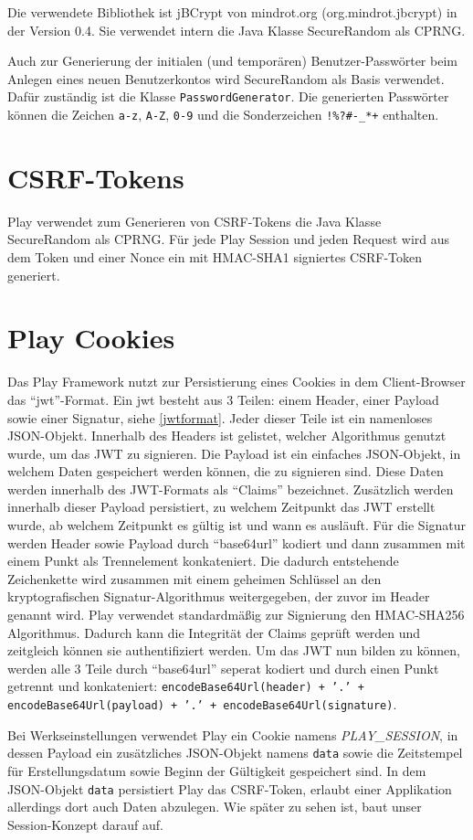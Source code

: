 \documentclass[12pt,DIV14,BCOR10mm,a4paper,parskip=half-,headsepline,headinclude,english,ngerman,bibliography=totocnumbered]{scrreprt}
\begin{document}
Die verwendete Bibliothek ist jBCrypt von mindrot.org (org.mindrot.jbcrypt) in der Version 0.4. Sie verwendet intern die Java Klasse SecureRandom als CPRNG.

Auch zur Generierung der initialen (und temporären) Benutzer-Passwörter beim Anlegen eines neuen Benutzerkontos wird SecureRandom als Basis verwendet. Dafür zuständig ist die Klasse \texttt{PasswordGenerator}. Die generierten Passwörter können die Zeichen \texttt{a-z}, \texttt{A-Z}, \texttt{0-9} und die Sonderzeichen \texttt{!\%?\#-\_*+} enthalten.

\section{CSRF-Tokens}
Play verwendet zum Generieren von CSRF-Tokens die Java Klasse SecureRandom als CPRNG. Für jede Play Session und jeden Request wird aus dem Token und einer Nonce ein mit HMAC-SHA1 signiertes CSRF-Token generiert.

\section{Play Cookies}
\label{play:cookies}
Das Play Framework nutzt zur Persistierung eines Cookies in dem Client-Browser das \enquote{\gls{jwt}}-Format.
Ein \gls{jwt} besteht aus 3 Teilen: einem Header, einer Payload sowie einer Signatur, siehe \ref{jwtformat}.
Jeder dieser Teile ist ein namenloses JSON-Objekt.
Innerhalb des Headers ist gelistet, welcher Algorithmus genutzt wurde, um das JWT zu signieren.
Die Payload ist ein einfaches JSON-Objekt, in welchem Daten gespeichert werden können, die zu signieren sind.
Diese Daten werden innerhalb des JWT-Formats als \enquote{Claims} bezeichnet.
Zusätzlich werden innerhalb dieser Payload persistiert, zu welchem Zeitpunkt das JWT erstellt wurde, ab welchem Zeitpunkt es gültig ist und wann es ausläuft.
Für die Signatur werden Header sowie Payload durch \enquote{base64url} kodiert und dann zusammen mit einem Punkt als Trennelement konkateniert. Die dadurch entstehende Zeichenkette wird zusammen mit einem geheimen Schlüssel an den kryptografischen Signatur-Algorithmus weitergegeben, der zuvor im Header genannt wird.
Play verwendet standardmäßig zur Signierung den HMAC-SHA256 Algorithmus.
Dadurch kann die Integrität der Claims geprüft werden und zeitgleich können sie authentifiziert werden.
Um das JWT nun bilden zu können, werden alle 3 Teile durch \enquote{base64url} seperat kodiert und durch einen Punkt getrennt und konkateniert: \texttt{encodeBase64Url(header) + '.' + encodeBase64Url(payload) + '.' + encodeBase64Url(signature)}.
\par
Bei Werkseinstellungen verwendet Play ein Cookie namens \textit{PLAY\_SESSION}, in dessen Payload ein zusätzliches JSON-Objekt namens \texttt{data} sowie die Zeitstempel für Erstellungsdatum sowie Beginn der Gültigkeit gespeichert sind.
In dem JSON-Objekt \texttt{data} persistiert Play das CSRF-Token, erlaubt einer Applikation allerdings dort auch Daten abzulegen.
Wie später zu sehen ist, baut unser Session-Konzept darauf auf.
\end{document}

